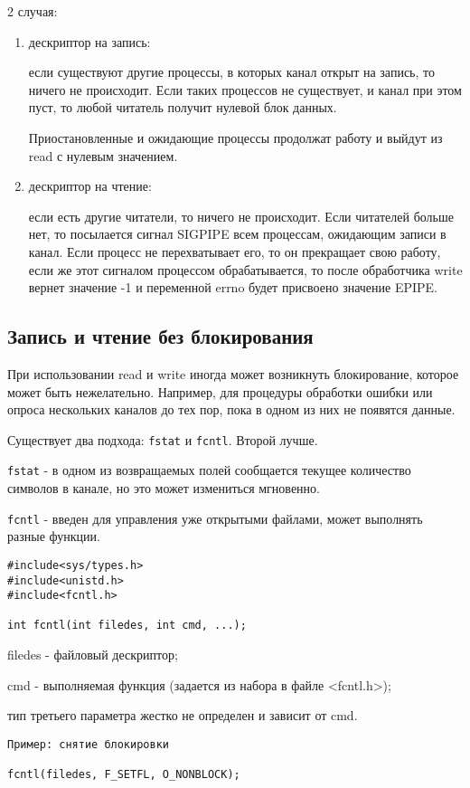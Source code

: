 2 случая:
\begin{enumerate}
\item дескриптор на запись:

если существуют другие процессы, в которых канал открыт на запись, то ничего не происходит. Если таких процессов не существует, и канал при этом пуст, то любой читатель получит нулевой блок данных.

Приостановленные и ожидающие процессы продолжат работу и выйдут из read с нулевым значением.  

\item дескриптор на чтение:

если есть другие читатели, то ничего не происходит. Если читателей больше нет, то посылается сигнал SIGPIPE всем процессам, ожидающим записи в канал. Если процесс не перехватывает его, то он прекращает свою работу, если же этот сигналом процессом обрабатывается, то после обработчика write вернет значение -1 и переменной errno будет присвоено значение EPIPE.
\end{enumerate}

\subsection{Запись и чтение без блокирования}

При использовании read и write иногда может возникнуть блокирование, которое может быть нежелательно. Например, для процедуры обработки ошибки или опроса нескольких каналов до тех пор, пока в одном из них не появятся данные.

Существует два подхода: \verb+fstat+ и \verb+fcntl+. Второй лучше.

\verb+fstat+ - в одном из возвращаемых полей сообщается текущее количество символов в канале, но это может измениться мгновенно.

\verb+fcntl+ - введен для управления уже открытыми файлами, может выполнять разные функции.
\begin{verbatim}
#include<sys/types.h>
#include<unistd.h>
#include<fcntl.h>

int fcntl(int filedes, int cmd, ...);
\end{verbatim}
filedes - файловый дескриптор;

cmd - выполняемая функция (задается из набора в файле <fcntl.h>);

тип третьего параметра жестко не определен и зависит от cmd.
\begin{verbatim}
Пример: снятие блокировки

fcntl(filedes, F_SETFL, O_NONBLOCK);
\end{verbatim}

